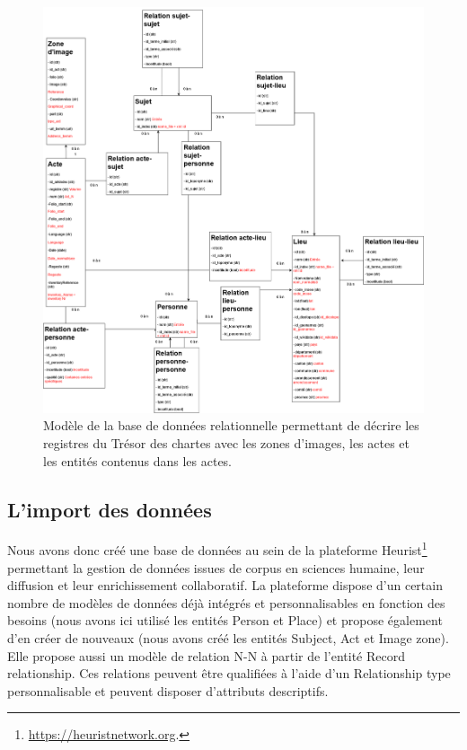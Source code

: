 \documentclass[a4paper,12pt,twoside]{book}
\begin{document}
	\begin{figure}
		\centering
		\includegraphics[width=\textwidth]{Images/modele_bd.png}
		\caption{Modèle de la base de données relationnelle permettant de décrire les registres du Trésor des chartes avec les zones d'images, les actes et les entités contenus dans les actes.}
		\label{Modele_bd}
	\end{figure}
	
	\subsection{L'import des données}
	
	Nous avons donc créé une base de données au sein de la plateforme Heurist\footnote{\url{https://heuristnetwork.org}.} permettant la gestion de données issues de corpus en sciences humaine, leur diffusion et leur enrichissement collaboratif. La plateforme dispose d'un certain nombre de modèles de données déjà intégrés et personnalisables en fonction des besoins (nous avons ici utilisé les entités \og Person\fg{} et \og Place\fg{}) et propose également d'en créer de nouveaux (nous avons créé les entités \og Subject\fg{}, \og Act\fg{} et \og Image zone\fg{}). Elle propose aussi un modèle de relation N-N à partir de l'entité \og Record relationship\fg{}. Ces relations peuvent être qualifiées à l'aide d'un \og Relationship type\fg{} personnalisable et peuvent disposer d'attributs descriptifs.
	
\end{document}

